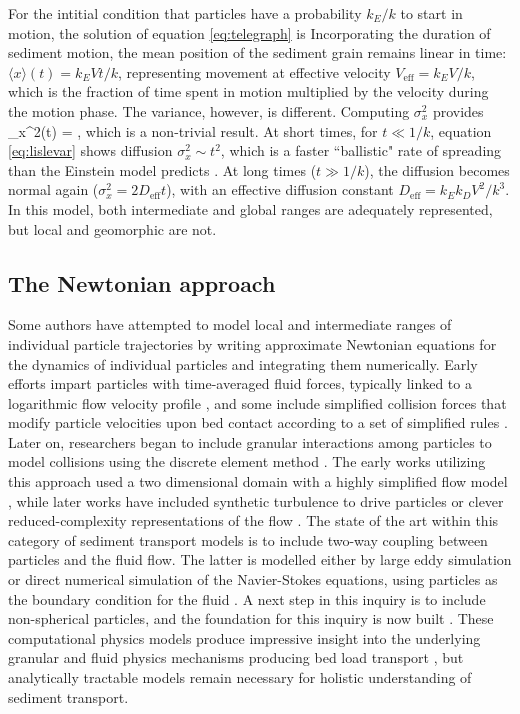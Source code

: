 For the intitial condition that particles have a probability $k_E/k$ to start in motion, the solution of equation \ref{eq:telegraph} is \citep{Lisle1998}
\be \ee
Incorporating the duration of sediment motion, the mean position of the sediment grain remains linear in time: $\langle x \rangle (t) = k_E V t/k$, representing movement at effective velocity $V_\text{eff} = k_E V/k$, which is the fraction of time spent in motion multiplied by the velocity during the motion phase. The variance, however, is different.
Computing $\sigma_x^2$ provides
\be \sigma_x^2(t) = ,\ee
which is a non-trivial result. At short times, for $t\ll 1/k$, equation \ref{eq:lislevar} shows diffusion $\sigma_x^2 \sim t^2$, which is a faster ``ballistic" rate of spreading than the Einstein model predicts \citep{Sokolov2014}. At long times ($t\gg 1/k$), the diffusion becomes normal again ($\sigma_x^2 = 2 D_\text{eff} t$), with an effective diffusion constant $ D_\text{eff} = k_E k_D V^2/k^3$.
In this model, both intermediate and global ranges are adequately represented, but local and geomorphic are not.

\subsection{The Newtonian approach}

Some authors have attempted to model local and intermediate ranges of individual particle trajectories by writing approximate Newtonian equations for the dynamics of individual particles and integrating them numerically. Early efforts impart particles with time-averaged fluid forces, typically linked to a logarithmic flow velocity profile \citep{VanRijn1984}, and some include simplified collision forces that modify particle velocities upon bed contact according to a set of simplified rules \citep{Wiberg1985,Sekine1992}.
Later on, researchers began to include granular interactions among particles to model collisions using the discrete element method \citep{Cundall1979, Haff1993}.
The early works utilizing this approach used a two dimensional domain with a highly simplified flow model \citep{Jiang1993}, while later works have included synthetic turbulence to drive particles \citep{McEwan2001,Schmeeckle2003,Maurin2015} or clever reduced-complexity representations of the flow \citep{Clark2015,Clark2017}.
The state of the art within this category of sediment transport models is to include two-way coupling between particles and the fluid flow. The latter is modelled either by large eddy simulation or direct numerical simulation of the Navier-Stokes equations, using particles as the boundary condition for the fluid \citep{Schmeeckle2014,Ji2013,Gonzalez2017,Vowincklel2014,Elghannay2017,Yousefi2020}.
A next step in this inquiry is to include non-spherical particles, and the foundation for this inquiry is now built \citep{Wachs2011, Azema2012, Wachs2019}.
These computational physics models produce impressive insight into the underlying granular and fluid physics mechanisms producing bed load transport \citep{Frey2011}, but analytically tractable models remain necessary for holistic understanding of sediment transport.

